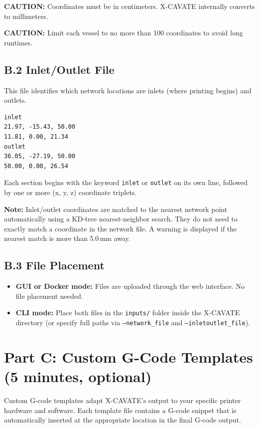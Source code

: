 \documentclass[11pt,letterpaper]{article}
\newcommand{\caution}[1]{\par\textcolor{cautionred}{\textbf{CAUTION:} #1}\par}
\newcommand{\note}[1]{\par\textcolor{notegray}{\textbf{Note:} #1}\par}
\newcommand{\code}[1]{\texttt{#1}}
\begin{document}
\caution{Coordinates must be in centimeters. X-CAVATE internally converts to millimeters.}
\caution{Limit each vessel to no more than 100 coordinates to avoid long runtimes.}

\subsection{B.2 Inlet/Outlet File}

This file identifies which network locations are inlets (where printing begins) and outlets.

\begin{lstlisting}
inlet
21.97, -15.43, 50.00
11.81, 0.00, 21.34
outlet
36.05, -27.19, 50.00
50.00, 0.00, 26.54
\end{lstlisting}

Each section begins with the keyword \code{inlet} or \code{outlet} on its own line, followed by one or more (x, y, z) coordinate triplets.

\note{Inlet/outlet coordinates are matched to the nearest network point automatically using a KD-tree nearest-neighbor search. They do not need to exactly match a coordinate in the network file. A warning is displayed if the nearest match is more than 5.0\,mm away.}

\subsection{B.3 File Placement}

\begin{itemize}
    \item \textbf{GUI or Docker mode:} Files are uploaded through the web interface. No file placement needed.
    \item \textbf{CLI mode:} Place both files in the \code{inputs/} folder inside the X-CAVATE directory (or specify full paths via \code{--network\_file} and \code{--inletoutlet\_file}).
\end{itemize}


\section{Part C: Custom G-Code Templates (5 minutes, optional)}

Custom G-code templates adapt X-CAVATE's output to your specific printer hardware and software. Each template file contains a G-code snippet that is automatically inserted at the appropriate location in the final G-code output.
\end{document}
